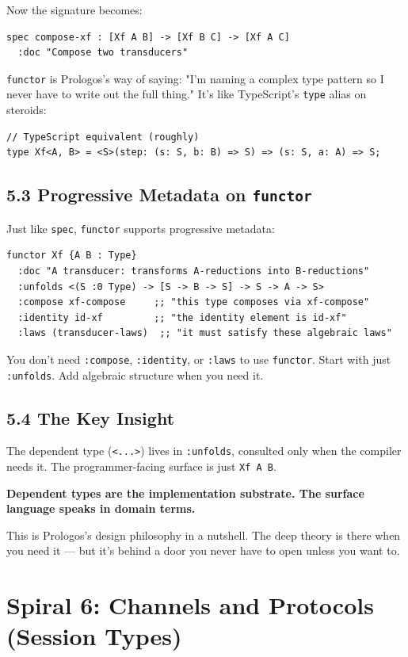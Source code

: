 \documentclass[11pt]{article}
\begin{document}
Now the signature becomes:

\begin{verbatim}
spec compose-xf : [Xf A B] -> [Xf B C] -> [Xf A C]
  :doc "Compose two transducers"
\end{verbatim}

\texttt{functor} is Prologos's way of saying: "I'm naming a complex type
pattern so I never have to write out the full thing." It's like
TypeScript's \texttt{type} alias on steroids:

\begin{verbatim}
// TypeScript equivalent (roughly)
type Xf<A, B> = <S>(step: (s: S, b: B) => S) => (s: S, a: A) => S;
\end{verbatim}
\subsection{5.3 Progressive Metadata on \texttt{functor}}
\label{sec:org8c6aef3}

Just like \texttt{spec}, \texttt{functor} supports progressive metadata:

\begin{verbatim}
functor Xf {A B : Type}
  :doc "A transducer: transforms A-reductions into B-reductions"
  :unfolds <(S :0 Type) -> [S -> B -> S] -> S -> A -> S>
  :compose xf-compose     ;; "this type composes via xf-compose"
  :identity id-xf         ;; "the identity element is id-xf"
  :laws (transducer-laws)  ;; "it must satisfy these algebraic laws"
\end{verbatim}

You don't need \texttt{:compose}, \texttt{:identity}, or \texttt{:laws} to use \texttt{functor}.
Start with just \texttt{:unfolds}. Add algebraic structure when you need it.
\subsection{5.4 The Key Insight}
\label{sec:orgd46a3eb}

The dependent type (\texttt{<...>}) lives in \texttt{:unfolds}, consulted only when
the compiler needs it. The programmer-facing surface is just \texttt{Xf A B}.

\textbf{Dependent types are the implementation substrate. The surface language
speaks in domain terms.}

This is Prologos's design philosophy in a nutshell. The deep theory is
there when you need it --- but it's behind a door you never have to open
unless you want to.
\section{Spiral 6: Channels and Protocols (Session Types)}
\label{sec:orge5253eb}
\end{document}
